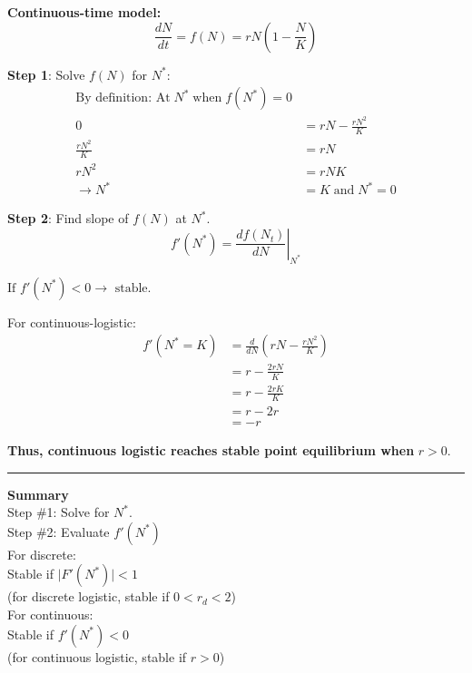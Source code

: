\documentclass{article}
\newcommand{\ind}{\-\hspace{1cm}}
\begin{document}
\textbf{Continuous-time model:}
\begin{equation*}
\frac{dN}{dt}=f(N)=rN\left(1-\frac{N}{K}\right)
\end{equation*}

\textbf{Step 1}:  Solve $f(N)$ for $N^*$:
\begin{align*}
	\text{By definition:  At}\; N^{*} \; \text{when} \; f(N^*)=0&\\
	0 & = rN-\frac{rN^2}{K}\\
	\frac{rN^2}{K}&=rN\\
	rN^2&=rNK\\
	\to N^*& = K \; \text{and} \; N^* =0	
\end{align*}

\textbf{Step 2}:  Find slope of $f(N)$ at $N^*$.  
\begin{equation*}
	f'(N^*)=\left.\frac{d f(N_t)}{dN}\right\vert_{N^*}
\end{equation*}
\begin{center}
	$\boxed{\text{If } f'(N^*) < 0 \to \text{ stable.}}$
\end{center}
\ind \ind For continuous-logistic:\\
\begin{align*}
	f'(N^*=K)&=\frac{d}{dN}\left(rN-\frac{rN^2}{K}\right)\\
	&=r-\frac{2r N}{K}\\
	&= r- \frac{2r K}{K}\\
	&= r-2r\\
	&= -r
\end{align*}

\begin{center}
\textbf{Thus, continuous logistic reaches stable point equilibrium when} $r>0$.
\end{center}

\rule[0.5ex]{\linewidth}{1pt}

\textbf{Summary}\\
Step \#1: Solve for $N^*$.\\
Step \#2: Evaluate $f'(N^*)$\\
\ind \ind For discrete:\\
\ind \ind \ind Stable if $\vert F'(N^*) \vert <1$\\
\ind \ind \ind \ind (for discrete logistic, stable if $0<r_d<2$)\\
\ind \ind For continuous:\\
\ind \ind \ind Stable if $f'(N^*) <0$\\
\ind \ind \ind \ind (for continuous logistic, stable if $r>0$)\\
\end{document}
